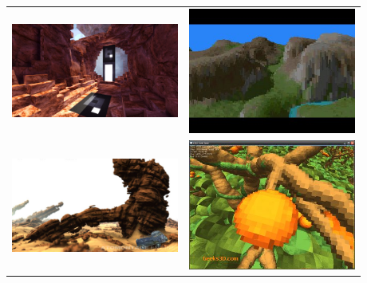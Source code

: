 \documentclass{beamer}
\begin{document}
\begin{frame}
 \begin{center}
  \begin{tabular}{ll}
   \includegraphics[width=5.5cm]{Images/Images_Alexis/voxel_engine3.jpg} &%
   \includegraphics[width=5.5cm]{Images/Images_Alexis/voxel_engine1.jpg} \\
   \includegraphics[width=5.5cm]{Images/Images_Alexis/voxel_engine4.jpg} &%
   \includegraphics[width=5.5cm]{Images/Images_Alexis/voxel_engine2.jpg} \\
  \end{tabular}
 \end{center}
\end{frame}
\end{document}
